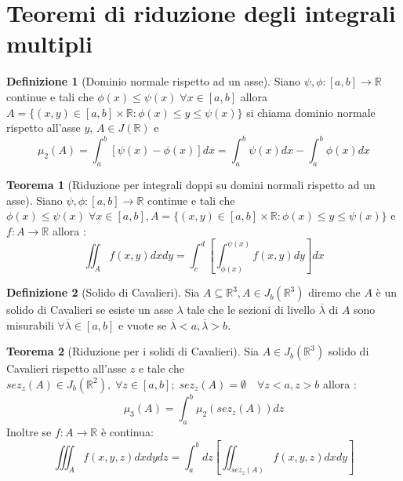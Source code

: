 \documentclass[leqno]{article}
\theoremstyle{definition}
\newtheorem{definition}{Definizione}[section]
\numberwithin{equation}{section}
\newtheorem{theorem}{Teorema}[section]
\theoremstyle{remark}
\begin{document}
	\section{Teoremi di riduzione degli integrali multipli}
	
	\begin{definition}[Dominio normale rispetto ad un asse]
		Siano $\psi, \phi:[a,b]\to \mathbb{R} $ continue e tali che $\phi(x)\le \psi(x) \; \forall x\in[a,b]$ allora $A=\{(x,y)\in[a,b]\times\mathbb{R} : \phi(x)\le y \le \psi(x)\}$ si chiama dominio normale rispetto all'asse $y$, $A\in J(\mathbb{R})$ e
		\begin{equation}
			\mu_2(A)=\int_a^b[\psi(x)-\phi(x)]dx=\int_a^b\psi(x)dx-\int_a^b\phi(x)dx
		\end{equation}
	\end{definition}
	\begin{theorem}[Riduzione per integrali doppi su domini normali rispetto ad un asse]
		Siano $\psi, \phi:[a,b]\to \mathbb{R} $ continue e tali che $\phi(x)\le \psi(x) \; \forall x\in[a,b], A=\{(x,y)\in[a,b]\times\mathbb{R} : \phi(x)\le y \le \psi(x)\}$ e $f:A\to \mathbb{R}$ allora :
		\begin{equation}
			\iint_Af(x,y)dxdy=\int_c^d\left[\int_{\phi(x)}^{\psi(x)}f(x,y)dy\right]dx
		\end{equation}
	\end{theorem}
	\begin{definition}[Solido di Cavalieri] 
		Sia $A\subseteq \mathbb{R}^3, A\in J_b (\mathbb{R}^3)$ diremo che $A$ è un solido di Cavalieri se esiste un asse $\lambda $ tale che le sezioni di livello $\overline{\lambda}$ di $A$ sono misurabili $\forall \overline{\lambda} \in [a,b]$ e vuote se $\overline{\lambda} < a, \overline{\lambda} > b$.
	\end{definition}
	\begin{theorem}[Riduzione per i solidi di Cavalieri]
		Sia $A\in J_b(\mathbb{R}^3)$ solido di Cavalieri rispetto all'asse $z$ e tale che $sez_z(A)\in J_b(\mathbb{R}^2),\; \forall z\in [a,b]; \; sez_z(A)=\emptyset \quad\forall z< a, z> b$ allora :
		\begin{equation}
			\mu_3(A)=\int_a^b\mu_2(sez_z(A))dz
		\end{equation}
		Inoltre se $f:A\to \mathbb{R}$ è continua: 
		\begin{equation}
			\iiint_Af(x,y,z)dxdydz=\int_a^bdz\left[\iint_{sez_z(A)}f(x,y,z)dxdy\right]
		\end{equation}
	\end{theorem}
\end{document}
